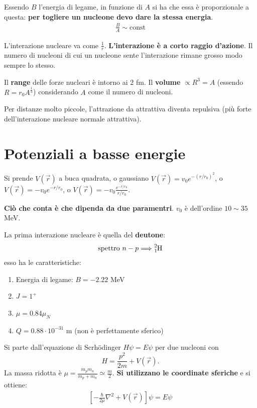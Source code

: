 \documentclass[a4paper,11pt,twoside,openany]{book}
\theoremstyle{definition}
\theoremstyle{plain}
\theoremstyle{plain}
\theoremstyle{definition}
\begin{document}
Essendo $B$ l'energia di legame, in funzione di $A$ si ha che essa è proporzionale a questa: \textbf{per togliere un nucleone devo dare la stessa energia}.
\begin{equation}\begin{split}
\frac{B}{A}\sim \textrm{const}
\end{split}\end{equation}

L'interazione nucleare va come $\frac{1}{r}$. \textbf{L'interazione è a corto raggio d'azione}. Il numero di nucleoni di cui un nucleone sente l'interazione rimane grosso modo sempre lo stesso.

Il \textbf{range} delle forze nucleari è intorno ai $2$ fm. Il \textbf{volume} $\propto R^3=A$ (essendo $R=r_0A^{\frac{1}{3}}$) considerando $A$ come il numero di nucleoni.

Per distanze molto piccole, l'attrazione da attrattiva diventa repulsiva (più forte dell'interazione nucleare normale attrattiva).

\section{Potenziali a basse energie} %
Si prende $V\left(\vec r\right)$ a buca quadrata, o gaussiano $V\left(\vec r\right)=v_0e^{-\left(r/r_0\right)^2}$, o $V\left(\vec r\right)=-v_0e^{-r/r_0}$, o $V\left(\vec r\right)=-v_0\frac{e^{-r/r_0}}{r/r_0}$. 

\textbf{Ciò che conta è che dipenda da due paramentri}. $v_0$ è dell'ordine $10\sim 35$ MeV.

La prima interazione nucleare è quella del \textbf{deutone}:
\begin{equation}\begin{split}
\textrm{spettro } n-p \Longrightarrow \ce{_1^2H}
\end{split}\end{equation}
esso ha le caratteristiche:
\begin{enumerate}
\item Energia di legame: $B=-2.22$ MeV
\item $J=1^+$
\item $\mu=0.84 \mu_N$
\item $Q=0.88\cdot 10^{-31}$ m (non è perfettamente sferico)
\end{enumerate}

Si parte dall'equazione di Scrhödinger $H\psi =E\psi $ per due nucleoni con $$H=\frac{p^2}{2m}+V\left(\vec r\right).$$ La massa ridotta è $\mu=\frac{m_pm_n}{m_p+m_n}\simeq\frac{m}{2}$. \textbf{Si utilizzano le coordinate sferiche} e si ottiene:
\begin{equation}\begin{split}
\left[-\frac{\hbar }{2\mu}\nabla ^2+V\left(\vec r\right)\right]\psi =E\psi 
\end{split}\end{equation}
\end{document}
